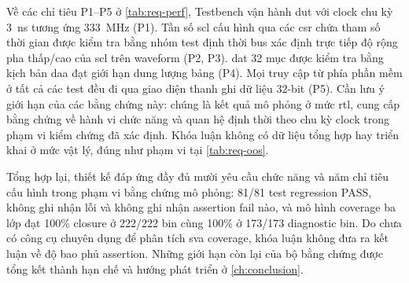 Về các chỉ tiêu P1--P5 ở \cref{tab:req-perf}, Testbench vận hành \gls{dut} với clock chu kỳ 3~ns tương
ứng 333~MHz (P1). Tần số \gls{scl} cấu hình qua các \gls{csr} chứa tham số thời gian được kiểm tra bằng nhóm test định thời bus xác định
trực tiếp độ rộng pha thấp/cao của \gls{scl} trên waveform (P2, P3). \gls{dat} 32 mục được kiểm tra bằng
kịch bản \gls{daa} đạt giới hạn dung lượng bảng (P4). Mọi truy cập từ phía phần mềm ở tất cả các test đều đi qua giao diện
thanh ghi dữ liệu 32-bit (P5). Cần lưu ý giới hạn của các bằng chứng này: chúng là kết quả
mô phỏng ở mức \gls{rtl}, cung cấp bằng chứng về hành vi chức năng và quan hệ định thời theo chu kỳ clock
trong phạm vi kiểm chứng đã xác định. Khóa luận
không có dữ liệu tổng hợp hay triển khai ở mức vật lý, đúng như phạm vi tại \cref{tab:req-oos}.

Tổng hợp lại, thiết kế đáp ứng đầy đủ mười yêu cầu chức năng và năm chỉ tiêu cấu hình trong phạm vi
bằng chứng mô phỏng: 81/81 test regression PASS, \Scoreboard{} không ghi nhận lỗi và không ghi nhận assertion fail nào,
và mô hình coverage ba lớp đạt 100\% closure ở 222/222 bin cùng 100\% ở 173/173 diagnostic bin.
Do chưa có công cụ chuyên dụng để phân tích \gls{sva} coverage, khóa luận không đưa ra kết luận về
độ bao phủ assertion. Những giới hạn còn lại của bộ bằng chứng được tổng kết thành hạn chế và hướng
phát triển ở \cref{ch:conclusion}.
